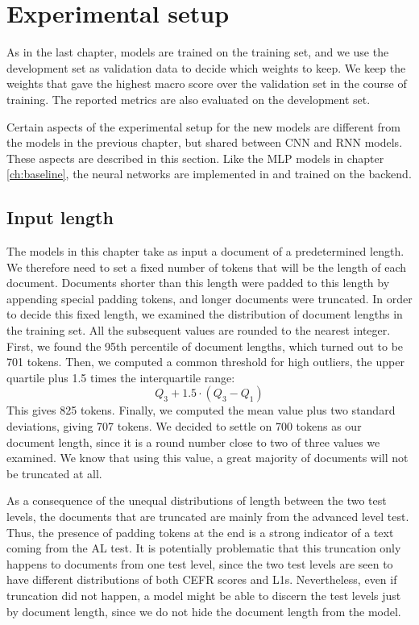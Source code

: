 \section{Experimental setup}

As in the last chapter, models are trained on the training set, and we use the
development set as validation data to decide which weights to keep. We keep
the weights that gave the highest macro \FI score over the validation set in
the course of training. The reported metrics are also evaluated on the
development set.

Certain aspects of the experimental setup for the new models are different
from the models in the previous chapter, but shared between \ac{CNN} and
\ac{RNN} models. These aspects are described in this section. Like the
\ac{MLP} models in chapter \ref{ch:baseline}, the neural networks are
implemented in \textcite{keras} and trained on the \textcite{tensorflow}
backend.


\subsection{Input length}

The models in this chapter take as input a document of a predetermined
length. We therefore need to set a fixed number of tokens that will be the
length of each document. Documents shorter than this length were padded to
this length by appending special padding tokens, and longer documents were
truncated. In order to decide this fixed length, we examined the distribution
of document lengths in the training set. All the subsequent values are
rounded to the nearest integer. First, we found the 95th percentile of
document lengths, which turned out to be 701 tokens. Then, we computed a
common threshold for high outliers, the upper quartile plus 1.5 times the
interquartile range:
\[
  Q_3 + 1.5 \cdot (Q_3 - Q_1)
\]
This gives 825 tokens. Finally, we computed the mean value plus two standard
deviations, giving 707 tokens. We decided to settle on 700 tokens as our
document length, since it is a round number close to two of three values we
examined. We know that using this value, a great majority of documents will
not be truncated at all.

As a consequence of the unequal distributions of length between the two test
levels, the documents that are truncated are mainly from the advanced level
test. Thus, the presence of padding tokens at the end is a strong indicator
of a text coming from the AL test. It is potentially problematic that this
truncation only happens to documents from one test level, since the two test
levels are seen to have different distributions of both CEFR scores and
\acp{L1}. Nevertheless, even if truncation did not happen, a model might be
able to discern the test levels just by document length, since we do not hide
the document length from the model.


